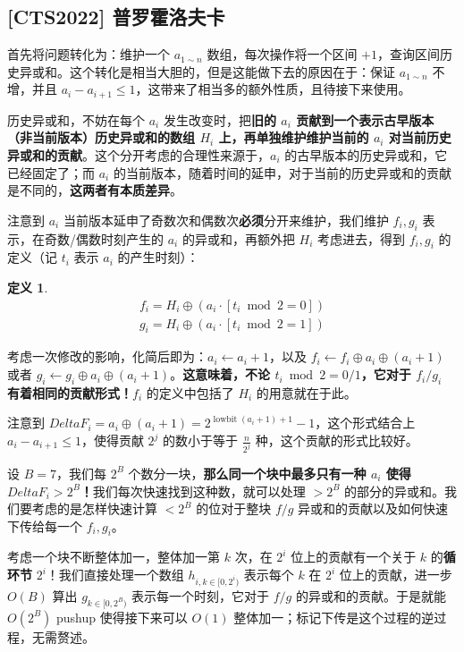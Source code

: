 \documentclass[12pt, a4paper, oneside]{ctexart}
\newtheorem{definition}{定义}[subsection]
\begin{document}
\subsection{[CTS2022] 普罗霍洛夫卡}

首先将问题转化为：维护一个 $a_{1\sim n}$ 数组，每次操作将一个区间 $+1$，查询区间历史异或和。这个转化是相当大胆的，但是这能做下去的原因在于：保证 $a_{1\sim n}$ 不增，并且 $a_i-a_{i+1}\le 1$，这带来了相当多的额外性质，且待接下来使用。

历史异或和，不妨在每个 $a_i$ 发生改变时，把\textbf{旧的 $a_i$ 贡献到一个表示古早版本（非当前版本）历史异或和的数组 $H_i$ 上，再单独维护维护当前的 $a_i$ 对当前历史异或和的贡献}。这个分开考虑的合理性来源于，$a_i$ 的古早版本的历史异或和，它已经固定了；而 $a_i$ 的当前版本，随着时间的延申，对于当前的历史异或和的贡献是不同的，\textbf{这两者有本质差异}。

注意到 $a_i$ 当前版本延申了奇数次和偶数次\textbf{必须}分开来维护，我们维护 $f_i,g_i$ 表示，在奇数/偶数时刻产生的 $a_i$ 的异或和，再额外把 $H_i$ 考虑进去，得到 $f_i,g_i$ 的定义（记 $t_i$ 表示 $a_i$ 的产生时刻）：

\begin{definition}
    \begin{align*}
        f_i=H_i\oplus (a_i\cdot[t_i \bmod 2 = 0])\\
        g_i=H_i\oplus (a_i\cdot[t_i \bmod 2 = 1])
    \end{align*}
\end{definition}

考虑一次修改的影响，化简后即为：$a_i\leftarrow a_i+1$，以及 $f_i\leftarrow f_i\oplus a_i \oplus (a_{i}+1)$ 或者 $g_i \leftarrow g_i \oplus a_i \oplus (a_{i}+1)$。\textbf{这意味着，不论 $t_i\bmod 2=0/1$，它对于 $f_i/g_i$ 有着相同的贡献形式！}$f_i$ 的定义中包括了 $H_i$ 的用意就在于此。

注意到 $DeltaF_i=a_i\oplus (a_i+1)=2^{\operatorname{lowbit}(a_i+1)+1}-1$，这个形式结合上 $a_i-a_{i+1}\le 1$，使得贡献 $2^j$ 的数小于等于 $\frac{n}{2^j}$ 种，这个贡献的形式比较好。

设 $B=7$，我们每 $2^B$ 个数分一块，\textbf{那么同一个块中最多只有一种 $a_i$ 使得 $DeltaF_i>2^B$！}我们每次快速找到这种数，就可以处理 $>2^B$ 的部分的异或和。我们要考虑的是怎样快速计算 $<2^B$ 的位对于整块 $f/g$ 异或和的贡献以及如何快速下传给每一个 $f_i,g_i$。

考虑一个块不断整体加一，整体加一第 $k$ 次，在 $2^i$ 位上的贡献有一个关于 $k$ 的\textbf{循环节} $2^i$！我们直接处理一个数组 $h_{i,k\in[0,2^i)}$ 表示每个 $k$ 在 $2^i$ 位上的贡献，进一步 $O(B)$ 算出 $g_{k\in[0,2^B)}$ 表示每一个时刻，它对于 $f/g$ 的异或和的贡献。于是就能 $O\left(2^B\right)$ pushup 使得接下来可以 $O(1)$ 整体加一；标记下传是这个过程的逆过程，无需赘述。
\end{document}
